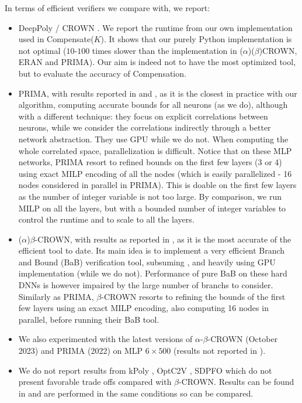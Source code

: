 \documentclass{llncs}
\begin{document}
In terms of efficient verifiers we compare with, we report:
\begin{itemize}
	\item DeepPoly \cite{deeppoly}/ CROWN \cite{crown}. We report the runtime from our own implementation used in Compensate($K$). It shows that our purely Python implementation is not optimal ($10$-$100$ times slower than the implementation in ($\alpha$)($\beta$)CROWN, ERAN and PRIMA). Our aim is indeed not to have the most optimized tool, but to evaluate the accuracy of Compensation.
	\item PRIMA, with results reported in \cite{prima} and \cite{crown}, as it is the closest in practice with our algorithm, computing accurate bounds for all neurons (as we do), although with a different technique: they focus on explicit correlations between neurons, while we consider the correlations indirectly through a better network abstraction. They use GPU while we do not. When computing the whole correlated space, 
	parallelization is difficult.
	Notice that on these MLP networks, PRIMA resort to refined bounds on the first few layers (3 or 4) using exact MILP encoding of all the nodes (which is easily parallelized - 16 nodes considered in parallel in PRIMA). This is doable on the first few layers as the number of integer variable is not too large. By comparison, we run MILP on all the layers, but with a bounded number of integer variables to control the runtime and to scale to all the layers.
	\item ($\alpha$)$\beta$-CROWN, with results as reported in \cite{crown}, as it is the most accurate of the efficient tool to date. Its main idea is to implement a very efficient Branch and Bound (BaB) verification tool, subsuming \cite{BaB}, and heavily using GPU implementation (while we do not). Performance of pure BaB on these hard DNNs is however impaired by the large number of branchs to consider. Similarly as PRIMA, $\beta$-CROWN resorts to refining the bounds of the first few layers using an exact MILP encoding, also computing 16 nodes in parallel, before running their BaB tool. 
	\item We also experimented with the latest versions of $\alpha$-$\beta$-CROWN (October 2023) and PRIMA (2022) on MLP $6 \times 500$ (results not reported in \cite{crown,prima}).
	\item We do not report results from kPoly \cite{kpoly}, OptC2V \cite{optC2V}, 
	SDPFO \cite{SDPFI} which do not present favorable trade offs compared with $\beta$-CROWN. Results can be found in \cite{crown} and are performed in the same conditions so can be compared.

\end{itemize}
\end{document}
